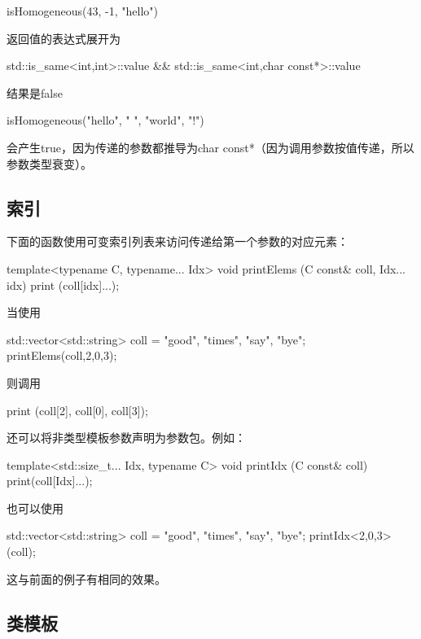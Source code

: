 \begin{cpp}
isHomogeneous(43, -1, "hello")
\end{cpp}

返回值的表达式展开为

\begin{cpp}
std::is_same<int,int>::value && std::is_same<int,char const*>::value
\end{cpp}

结果是false

\begin{cpp}
isHomogeneous("hello", " ", "world", "!")
\end{cpp}

会产生true，因为传递的参数都推导为char const*（因为调用参数按值传递，所以参数类型衰变）。

\subsection{索引}

下面的函数使用可变索引列表来访问传递给第一个参数的对应元素：

\begin{cpp}
template<typename C, typename... Idx>
void printElems (C const& coll, Idx... idx) {
	print (coll[idx]...);
}
\end{cpp}

当使用

\begin{cpp}
std::vector<std::string> coll = {"good", "times", "say", "bye"};
printElems(coll,2,0,3);
\end{cpp}

则调用

\begin{shell}
print (coll[2], coll[0], coll[3]);
\end{shell}

还可以将非类型模板参数声明为参数包。例如：

\begin{cpp}
template<std::size_t... Idx, typename C>
void printIdx (C const& coll) {
	print(coll[Idx]...);
}
\end{cpp}

也可以使用

\begin{cpp}
std::vector<std::string> coll = {"good", "times", "say", "bye"};
printIdx<2,0,3>(coll);
\end{cpp}

这与前面的例子有相同的效果。

\subsection{类模板}


